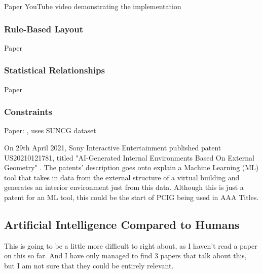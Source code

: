 Paper \cite{real-time-walkthroughs} YouTube video demonstrating the implementation \cite{youtube:real-time-walkthroughs}
\subsubsection*{Rule-Based Layout}
Paper \cite{rule-based-layout}
\subsubsection*{Statistical Relationships}
Paper \cite{make-it-home}
\subsubsection*{Constraints}
Paper: \cite{constrained-layouts}, uses SUNCG dataset \cite{suncg}

\bigskip
On 29th April 2021, Sony Interactive Entertainment published patent US20210121781, titled "AI-Generated Internal Environments Based On External Geometry" \cite{sony-patent}. The patents' description goes onto explain a Machine Learning (ML) tool that takes in data from the external structure of a virtual building and generates an interior environment just from this data. Although this is just a patent for an ML tool, this could be the start of PCIG being used in AAA Titles. 

\subsection{Artificial Intelligence Compared to Humans}
This is going to be a little more difficult to right about, as I haven't read a paper on this so far. And I have only managed to find 3 papers that talk about this, but I am not sure that they could be entirely relevant.